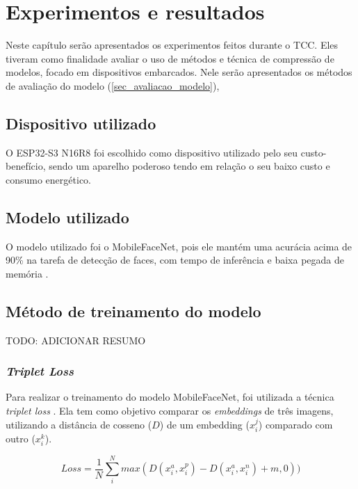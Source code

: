 \chapter{Experimentos e resultados}

Neste capítulo serão apresentados os experimentos feitos durante o TCC. Eles tiveram como
finalidade avaliar o uso de métodos e técnica de compressão de modelos, focado em dispositivos
embarcados. Nele serão apresentados os métodos de avaliação do modelo (\autoref{sec_avaliacao_modelo}),

\section{Dispositivo utilizado}\label{sec_dispositivo}
O ESP32-S3 N16R8 foi escolhido como dispositivo utilizado pelo seu custo-benefício,
sendo um aparelho poderoso tendo em relação o seu baixo custo e consumo energético.

\section{Modelo utilizado}\label{sec_modelo_utilizado}
O modelo utilizado foi o MobileFaceNet, pois ele mantém uma acurácia acima de 90\% na tarefa de detecção de faces,
com tempo de inferência e baixa pegada de memória \cite{leandro}.

\section{Método de treinamento do modelo}\label{sec_treinamento_modelo}
TODO: ADICIONAR RESUMO

\subsection{\textit{Triplet Loss}}
Para realizar o treinamento do modelo MobileFaceNet, foi utilizada a técnica \textit{triplet loss}
\cite{triplet_distillation_face_recognition}. Ela tem como objetivo comparar os \textit{embeddings} de três imagens,
utilizando a distância de cosseno ($D$) de um embedding ($x_i^j$) comparado com outro ($x_i^k$).

\begin{equation}\label{eq_triplet_loss}
	Loss = \frac 1 N \sum _i ^N max(D(x_i^a, x_i^p) - D(x_i^a, x_i^n) + m, 0))
\end{equation}
%
%

